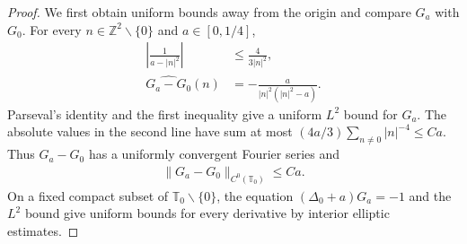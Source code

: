 \documentclass[a4paper,11pt,oneside,reqno]{amsart}
\numberwithin{equation}{section}
\theoremstyle{definition}
\begin{document}
\begin{proof}
    We first obtain uniform bounds away from the origin and
    compare $G_a$ with $G_0$. For every
    $n\in\mathbb Z^2\smallsetminus\{0\}$ and $a\in[0,1/4]$,
    \begin{align*}
        \left|\frac1{a-|n|^2}\right|
        &\leq\frac4{3|n|^2},\\
        \widehat{G_a-G_0}(n)
        &=-\frac{a}{|n|^2(|n|^2-a)}.
    \end{align*}
    Parseval's identity and the first inequality give a uniform
    $L^2$ bound for $G_a$. The absolute values in the second
    line have sum at most
    $(4a/3)\sum_{n\neq0}|n|^{-4}\leq Ca$. Thus $G_a-G_0$
    has a uniformly convergent Fourier series and
    \begin{align*}
        \|G_a-G_0\|_{C^0(\mathbb T_0)}\leq Ca.
    \end{align*}
    On a fixed compact subset of
    $\mathbb T_0\smallsetminus\{0\}$, the equation
    $(\Delta_0+a)G_a=-1$ and the $L^2$ bound give uniform
    bounds for every derivative by interior elliptic estimates.


\end{proof}
\end{document}
